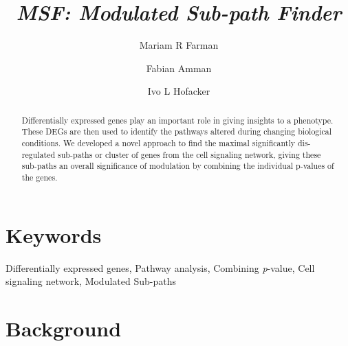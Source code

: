 \documentclass[twocolumn]{article}
\begin{document}
\title{\textit{MSF: Modulated Sub-path Finder} }

\author[1]{Mariam R Farman}
\author[1,2]{Fabian Amman}
\author[1]{Ivo L Hofacker}



\maketitle

\begin{abstract}
Differentially expressed genes play an important role in giving
insights to a phenotype. These DEGs are then used to identify the
pathways altered during changing biological conditions. We developed a
novel approach to find the maximal significantly dis-regulated
sub-paths or cluster of genes from the cell signaling network, giving
these sub-paths an overall significance of modulation by combining the
individual p-values of the genes.
\end{abstract}

\section*{Keywords}

Differentially expressed genes, Pathway analysis, Combining \textit{p}-value, Cell signaling network, Modulated Sub-paths


\section*{Background}
\end{document}
